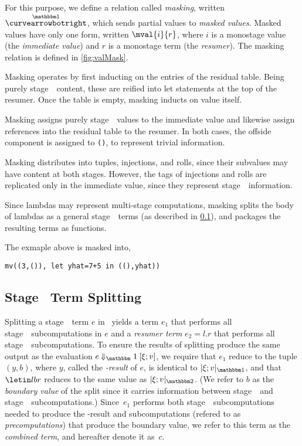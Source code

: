 \begin{concretesyntax}
For this purpose, we define a relation called {\em masking}, written $\vsplito$, 
which sends partial values to {\em masked values}.
Masked values have only one form, written $\mval {i} {r}$, 
where $i$ is a monostage value (the {\em immediate value}) and $r$ is a monostage term (the {\em resumer}).
The masking relation is defined in \ref{fig:valMask}.

Masking operates by first inducting on the entries of the residual table.  
Being purely stage~\bbtwo\ content, these are reified into let statements at the top of the resumer.
Once the table is empty, masking inducts on value itself.

Masking assigns purely stage~\bbone\ values to the immediate value
and likewise assign references into the residual table to the resumer.
In both cases, the offside component is assigned to \texttt{()}, to represent trivial information.

Masking distributes into tuples, injections, and rolls, since their subvalues may have content at both stages.
However, the tags of injections and rolls are replicated only in the immediate value, 
since they represent stage~\bbone\ information.

Since lambdas may represent multi-stage computations, 
masking splits the body of lambdas as a general stage~\bbone\ terms (as described in \ref{sec:split-one}), 
and packages the resulting terms as functions.

The exmaple above is masked into,
\begin{lstlisting}
mv((3,()), let yhat=7+5 in ((),yhat))
\end{lstlisting}

\subsection{Stage \bbone\ Term Splitting}
\label{sec:split-one}

Splitting a stage~\bbone\ term $e$ in \lang\ yields a term 
$e_1$ that performs all stage~\bbone\ subcomputations in $e$ and a \emph{resumer term} $e_2 = l.r$ that performs all stage~\bbtwo\ subcomputations.
To ensure the results of splitting produce the same output as the evaluation $e\mathbin{\redonesym}[\xi;v]$,
we require that $e_1$ reduce to the tuple $(y,b)$,
where $y$, called the \emph{\bbone-result} of $e$, is identical to $\masko{\xi;v}$, and that
$\letin l b r$ reduces to the same value as $\maskt{\xi;v}$. (We refer to $b$ as the \emph{boundary value} of the split since it carries information between stage~\bbone\ and stage~\bbtwo\ subcomputations.) Since~$e_1$ performs both stage~\bbone\ subcomputations needed to produce the \bbone-result and subcomputations (refered to as \emph{precomputations}) that produce the boundary value, we refer to this term as the \emph{combined term}, and hereafter denote it as~$c$.


\end{concretesyntax}
